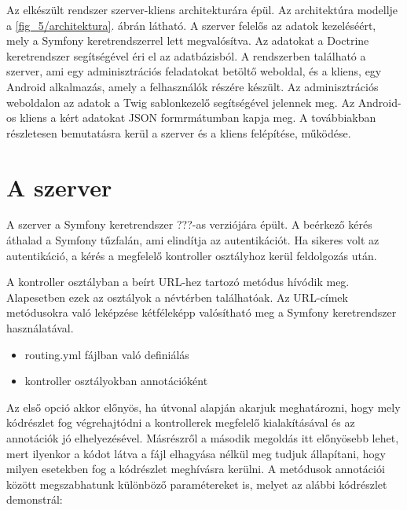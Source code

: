 Az elkészült rendszer szerver-kliens architekturára épül.
Az architektúra modellje a \ref{fig_5/architektura}. ábrán látható. 
A szerver felelős az adatok kezeléséért, mely a Symfony keretrendszerrel lett megvalósítva. 
Az adatokat a Doctrine keretrendszer segítségével éri el az adatbázisból. 
A rendszerben található a szerver, ami egy adminisztrációs feladatokat betöltő weboldal, és a kliens, egy Android alkalmazás, amely a felhasználók részére készült. 
Az adminisztrációs weboldalon az adatok a Twig sablonkezelő segítségével jelennek meg. 
Az Android-os kliens a kért adatokat JSON formrmátumban kapja meg. 
A továbbiakban részletesen bemutatásra kerül a szerver és a kliens felépítése, működése. 


\section{A szerver}
\label{szerverfelepites}

A szerver a Symfony keretrendszer ???-as verziójára épült. 
A beérkező kérés áthalad a Symfony tűzfalán, ami elindítja az autentikációt. 
Ha sikeres volt az autentikáció, a kérés a megfelelő kontroller osztályhoz kerül feldolgozás után. 


A kontroller osztályban a beírt URL-hez tartozó metódus hívódik meg. 
Alapesetben ezek az osztályok a  névtérben találhatóak. 
Az URL-címek metódusokra való leképzése kétféleképp valósítható meg a Symfony keretrendszer használatával. 

\begin{itemize}
	\item routing.yml fájlban való definiálás
	\item kontroller osztályokban annotációként
\end{itemize}

Az első opció akkor előnyös, ha útvonal alapján akarjuk meghatározni, hogy mely kódrészlet fog végrehajtódni a kontrollerek megfelelő kialakításával és az annotációk jó elhelyezésével. 
Másrészről a második megoldás itt előnyösebb lehet, mert ilyenkor a kódot látva a fájl elhagyása nélkül meg tudjuk állapítani, hogy milyen esetekben fog a kódrészlet meghívásra kerülni. 
A metódusok annotációi között megszabhatunk különböző paramétereket is, melyet az alábbi kódrészlet demonstrál:

